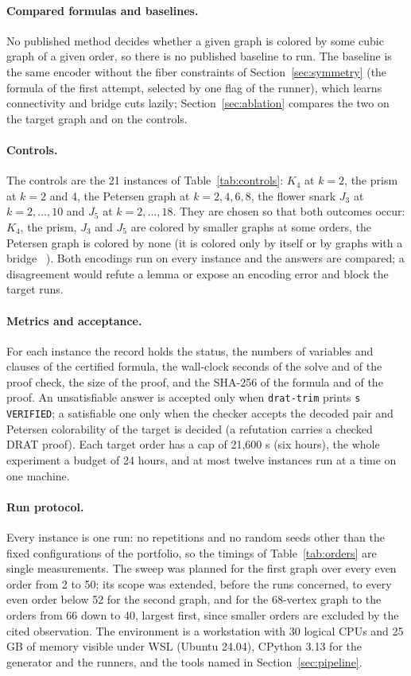 \paragraph{Compared formulas and baselines.} No published method decides whether a given graph is colored by some cubic graph of a given order, so there is no published baseline to run. The baseline is the same encoder without the
fiber constraints of Section~\ref{sec:symmetry} (the formula of the first attempt, selected by one flag of the runner), which learns connectivity and bridge cuts lazily; Section~\ref{sec:ablation} compares the two on the target graph and on the controls.

\paragraph{Controls.} The controls are the 21 instances of Table~\ref{tab:controls}: $K_4$ at $k = 2$, the prism at $k = 2$ and 4, the Petersen graph at $k = 2, 4, 6, 8$, the flower snark $J_3$ at $k = 2, \dots, 10$ and $J_5$ at $k = 2, \dots, 18$.
They are chosen so that both outcomes occur: $K_4$, the prism, $J_3$ and $J_5$ are colored by smaller graphs at some orders, the Petersen graph is colored by none (it is colored only by itself or by graphs with a bridge~\cite[Section~5.4]{GJMMMU2026} \evU{}). Both encodings run on every instance and
the answers are compared; a disagreement would refute a lemma or expose an encoding error and block the target runs.

\paragraph{Metrics and acceptance.} For each instance the record holds the status, the numbers of variables and clauses of the certified formula, the wall-clock seconds of the solve and of the proof check, the size of the proof, and the SHA-256 of the
formula and of the proof. An unsatisfiable answer is accepted only when \texttt{drat-trim} prints \texttt{s VERIFIED}; a satisfiable one only when the checker accepts the decoded pair and Petersen colorability of the target is decided (a refutation carries a checked DRAT proof).
Each target order has a cap of 21{,}600 s (six hours), the whole experiment a budget of 24 hours, and at most twelve instances run at a time on one machine.

\paragraph{Run protocol.} Every instance is one run: no repetitions and no random seeds other than the fixed configurations of the portfolio, so the timings of Table~\ref{tab:orders} are single measurements. The sweep was planned for the first graph over every even order from 2 to 50; its scope was extended, before the runs concerned, to every even order below 52 for the second graph, and for the 68-vertex graph to the orders from 66 down to 40, largest first, since smaller orders are excluded by the cited observation.
The environment is a workstation with 30 logical CPUs and 25 GB of memory visible under WSL (Ubuntu 24.04), CPython 3.13 for the generator and the runners, and the tools named in Section~\ref{sec:pipeline}.


